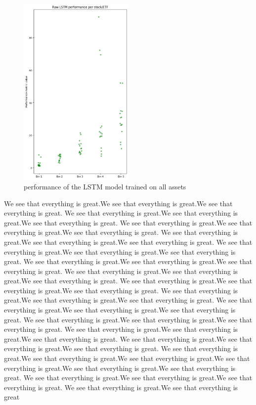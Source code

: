 \documentclass[a4paper,12pt]{report}
\begin{document}
\begin{figure}
  \includegraphics[width=0.5\textwidth]{images/results_LSTM.png}
  \caption{performance of the LSTM model trained on all assets}
  \label{fig:wrapped}
\end{figure}
	

We see that everything is great.We see that everything is great.We see that everything is great.
We see that everything is great.We see that everything is great.We see that everything is great.
We see that everything is great.We see that everything is great.We see that everything is great.
We see that everything is great.We see that everything is great.We see that everything is great.
We see that everything is great.We see that everything is great.We see that everything is great.
We see that everything is great.We see that everything is great.We see that everything is great.
We see that everything is great.We see that everything is great.We see that everything is great.
We see that everything is great.We see that everything is great.We see that everything is great.
We see that everything is great.We see that everything is great.We see that everything is great.
We see that everything is great.We see that everything is great.We see that everything is great.
We see that everything is great.We see that everything is great.We see that everything is great.
We see that everything is great.We see that everything is great.We see that everything is great.
We see that everything is great.We see that everything is great.We see that everything is great.
We see that everything is great.We see that everything is great.We see that everything is great.We see that everything is great.We see that everything is great.We see that everything is great.
We see that everything is great.We see that everything is great.We see that everything is great.
We see that everything is great.We see that everything is great
\end{document}

